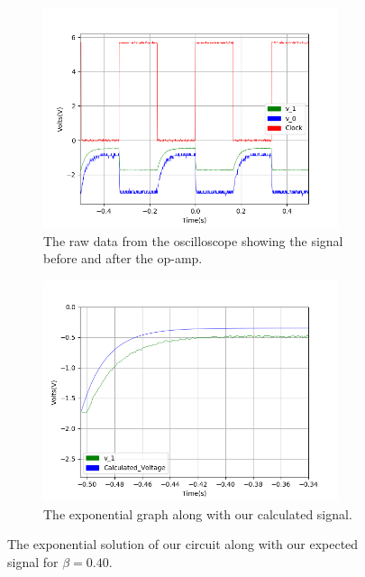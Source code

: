 \begin{figure}[h!]
\centering
\begin{subfigure}[t]{.475\textwidth}
  \centering
  \includegraphics[width=0.95\textwidth, height=0.22\textheight]{figures/Exponential/scope_28raw.png}
  \caption{The raw data from the oscilloscope showing the signal before and after the op-amp.}
 \label{fig:Exp_4_raw}
\end{subfigure}\hfill
\begin{subfigure}[t]{.475\textwidth}
  \centering
  \includegraphics[width=0.95\textwidth, height=0.22\textheight]{figures/Exponential/scope_28_calc.png}
  \caption{The exponential graph along with our calculated signal.}
\label{fig:Exp_4_calc}
\end{subfigure}
\caption{The exponential solution of our circuit along with our expected signal for $\beta = 0.40$.}
\label{fig:Exp_4}
\end{figure}

